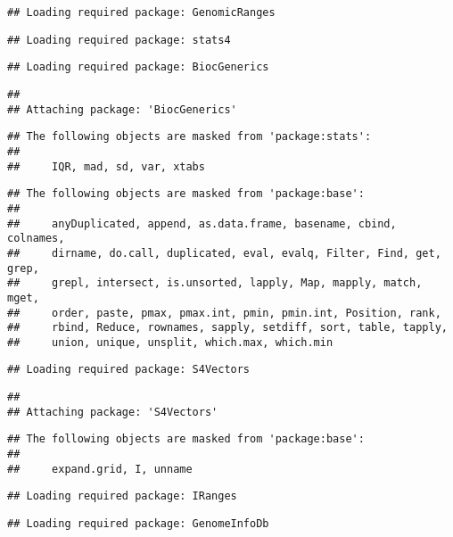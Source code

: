 \documentclass[
  oneside]{book}
\begin{document}
\begin{verbatim}
## Loading required package: GenomicRanges
\end{verbatim}

\begin{verbatim}
## Loading required package: stats4
\end{verbatim}

\begin{verbatim}
## Loading required package: BiocGenerics
\end{verbatim}

\begin{verbatim}
## 
## Attaching package: 'BiocGenerics'
\end{verbatim}

\begin{verbatim}
## The following objects are masked from 'package:stats':
## 
##     IQR, mad, sd, var, xtabs
\end{verbatim}

\begin{verbatim}
## The following objects are masked from 'package:base':
## 
##     anyDuplicated, append, as.data.frame, basename, cbind, colnames,
##     dirname, do.call, duplicated, eval, evalq, Filter, Find, get, grep,
##     grepl, intersect, is.unsorted, lapply, Map, mapply, match, mget,
##     order, paste, pmax, pmax.int, pmin, pmin.int, Position, rank,
##     rbind, Reduce, rownames, sapply, setdiff, sort, table, tapply,
##     union, unique, unsplit, which.max, which.min
\end{verbatim}

\begin{verbatim}
## Loading required package: S4Vectors
\end{verbatim}

\begin{verbatim}
## 
## Attaching package: 'S4Vectors'
\end{verbatim}

\begin{verbatim}
## The following objects are masked from 'package:base':
## 
##     expand.grid, I, unname
\end{verbatim}

\begin{verbatim}
## Loading required package: IRanges
\end{verbatim}

\begin{verbatim}
## Loading required package: GenomeInfoDb
\end{verbatim}
\end{document}
